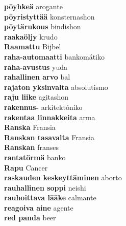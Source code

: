 \textbf{ pöyhkeä  } arogante \\
\textbf{ pöyristyttää  } konsternashon \\
\textbf{ pöytärukous  } bindishon \\
\textbf{ raakaöljy  } krudo \\
\textbf{ Raamattu  } Bijbel \\
\textbf{ raha-automaatti  } bankomátiko \\
\textbf{ raha-avustus  } yuda \\
\textbf{ rahallinen arvo  } bal \\
\textbf{ rajaton yksinvalta  } absolutismo \\
\textbf{ raju liike  } agitashon \\
\textbf{ rakennus-  } arkitektóniko \\
\textbf{ rakentaa linnakkeita  } arma \\
\textbf{ Ranska  } Fransia \\
\textbf{ Ranskan tasavalta  } Fransia \\
\textbf{ Ranskan  } franses \\
\textbf{ rantatörmä  } banko \\
\textbf{ Rapu  } Cancer \\
\textbf{ raskauden keskeyttäminen  } aborto \\
\textbf{ rauhallinen soppi  } neishi \\
\textbf{ rauhoittava lääke  } calmante \\
\textbf{ reagoiva aine  } agente \\
\textbf{ red panda  } beer \\
